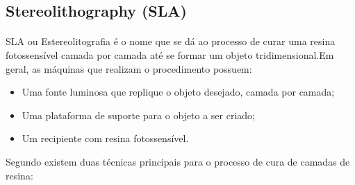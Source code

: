 \documentclass[12pt, english]{article}
\begin{document}
\subsection{Stereolithography (SLA)}

\paragraph{}
SLA ou Estereolitografia é o nome que se dá ao processo de curar uma resina fotossensível camada por camada até se formar um objeto tridimensional.Em geral, as máquinas que realizam o procedimento possuem:
\begin{itemize}
\item Uma fonte luminosa que replique o objeto desejado, camada por camada;
\item Uma plataforma de suporte para o objeto a ser criado;
\item Um recipiente com resina fotossensível.
\end{itemize}

Segundo \cite{Coelho2018} existem duas técnicas principais para o processo de cura de camadas de resina:
\end{document}
